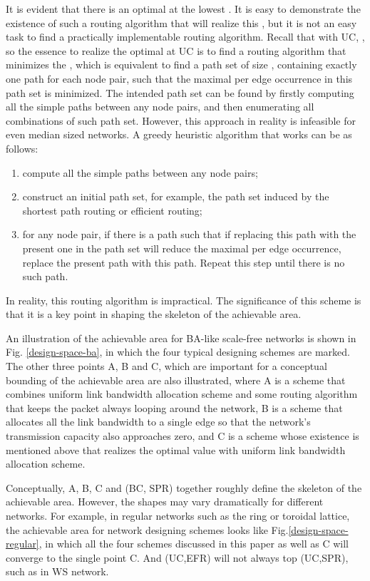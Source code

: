 \documentclass[journal]{IEEEtran}
\begin{document}
{It is evident that there is an optimal  at the lowest
. It is easy to demonstrate the existence of such a routing
algorithm that will realize this , but it is not an easy task
to find a practically implementable routing algorithm. Recall that
with UC, , so the essence to
realize the optimal  at UC is to find a routing algorithm that
minimizes the , which is equivalent to find a path
set of size , containing exactly one path for each node
pair, such that the maximal per edge occurrence in this path set is
minimized. The intended path set can be found by firstly computing
all the simple paths between any node pairs, and then enumerating
all combinations of such path set. However, this approach in reality
is infeasible for even median sized networks. A greedy heuristic
algorithm that works can be as follows:

 \begin{enumerate}
 \item
compute all the simple paths between any node pairs;
\item construct
an initial path set, for example, the path set induced by the
shortest path routing or efficient routing;
\item for any node pair, if there is a path such that if replacing this path with the
present one in the path set will reduce the maximal per edge
occurrence, replace the present path with this path. Repeat this
step until there is no such path.
\end{enumerate}

In reality, this routing algorithm is impractical. The significance
of this scheme is that it is a key point in shaping the skeleton of
the achievable area.

An illustration of the achievable area  for BA-like scale-free
networks is shown in Fig. \ref{design-space-ba}, in which the four
typical designing schemes are marked. The other three points A, B
and C, which are important for a conceptual bounding of the
achievable area are also illustrated, where A is a scheme that
combines uniform link bandwidth allocation scheme and some routing
algorithm that keeps the packet always looping around the network, B
is a scheme that allocates all the link bandwidth to a single edge
so that the network's transmission capacity also approaches zero,
and C is a scheme whose existence is mentioned above that realizes
the optimal  value with uniform link bandwidth allocation
scheme.

Conceptually, A, B, C and (BC, SPR) together roughly define the
skeleton of the achievable area. However, the shapes may vary
dramatically for different networks. For example, in regular
networks such as the ring or toroidal lattice, the achievable area
for network designing schemes looks like
Fig.\ref{design-space-regular}, in which all the four schemes
discussed in this paper as well as C will converge to the single
point C. And (UC,EFR) will not always top (UC,SPR), such as in WS
network.


}
\end{document}
